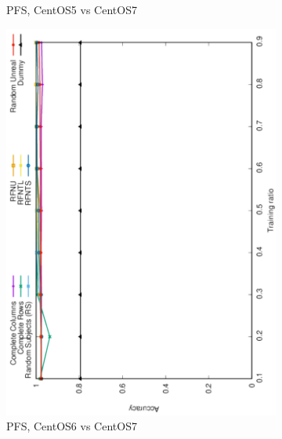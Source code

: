 \documentclass[10pt, conference, compsocconf]{IEEEtran}
\begin{document}
\begin{figure}
\begin{subfigure}[b]{0.4\linewidth}
        \caption{PFS, CentOS5 vs CentOS7}
        \label{fig:pfs-c5vsc7-bias}
\end{subfigure}
\begin{subfigure}[b]{0.4\linewidth}
        \includegraphics[width=0.8\columnwidth, angle=-90]{data/results/means_of_results/ALS-Bias/PreFreeSurfer/ALS-Bias-PFS-6v7.pdf}
        \caption{PFS, CentOS6 vs CentOS7}
\end{subfigure}\hfill
\begin{subfigure}[b]{0.4\linewidth}

\end{subfigure}
\end{figure}
\end{document}
